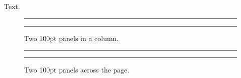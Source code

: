 \documentclass[twocolumn]{article}
\begin{document}
Text.
\begin{figure}
\centering
\rule{100pt}{1cm}\hfill\rule{100pt}{1cm}
\caption{Two 100pt panels in a column.}
\end{figure}
\begin{figure}
\centering
\rule{100pt}{1cm}\hfill\rule{100pt}{1cm}
\caption{Two 100pt panels across the page.}
\end{figure}
\end{document}
